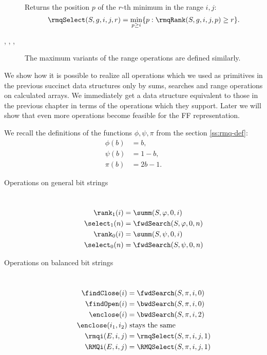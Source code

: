 \begin{description}
\begin{description}
		\item[\rmqSelect{}]
		Returns the position $p$ of the $r$-th minimum in the range $i, j$:
		$$\rmqSelect(S, g, i, j, r) = \min_{p \ge i} \{p : \rmqRank(S, g, i, j, p) \ge r\}.$$
		
		\item[\RMQ{}, \RMQSize{}, \RMQRank{}, \RMQSelect{}]
		The maximum variants of the range operations are defined similarly.
	\end{description}
\end{description}

\bigbreak

We show how it is possible to realize all operations which we used as primitives in the previous succinct data structures only by sums, searches and range operations on calculated arrays.
We immediately get a data structure equivalent to those in the previous chapter in terms of the operations which they support.
Later we will show that even more operations become feasible for the FF representation.

We recall the definitions of the functions $\phi, \psi, \pi$ from the section \ref{ss:rmq-def}:
\begin{align*}
	\phi(b) &= b, \\
	\psi(b) &= 1 - b, \\
	\pi(b) &= 2 b - 1.
\end{align*}

\begin{description}
	\item[Operations on general bit strings]~\vspace{-1\baselineskip}
	\begin{align*}
		\rank_1(i) &= \summ(S, \phi, 0, i) \\
		\select_1(n) &= \fwdSearch(S, \phi, 0, n) \\
		\rank_0(i) &= \summ(S, \psi, 0, i) \\
		\select_0(n) &= \fwdSearch(S, \psi, 0, n)
	\end{align*}
	
	\item[Operations on balanced bit strings]~\vspace{-1\baselineskip}
	\begin{align*}
		\findClose(i) &= \fwdSearch(S, \pi, i, 0) \\
		\findOpen(i) &= \bwdSearch(S, \pi, i, 0) \\
		\enclose(i) &= \bwdSearch(S, \pi, i, 2) \\
		\enclose(i_1, i_2)&\ \textrm{stays the same} \\
		\rmqi(E, i, j) &= \rmqSelect(S, \pi, i, j, 1) \\
		\RMQi(E, i, j) &= \RMQSelect(S, \pi, i, j, 1)
	\end{align*}
\end{description}

